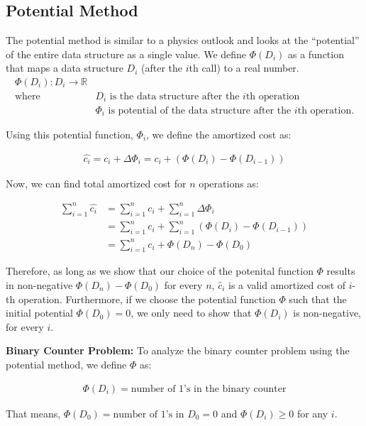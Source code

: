 \documentclass[11pt]{article}
\theoremstyle{definition}
\begin{document}
\subsection{Potential Method}
\label{sub:potential}

The potential method is similar to a physics outlook and looks at the ``potential'' of the entire data structure as a single value.  
We define $\Phi(D_i)$ as a function that maps a data structure $D_i$ (after the $i$th call) to a real number.
\begin{align*}
\Phi(D_i) : D_i \rightarrow \mathbb{R}&\\
\text{where } & \text{$D_i$ is the data structure after the $i$th operation}\\
&\Phi_i \text{ is potential of the data structure after the $i$th operation.}
\end{align*}

Using this potential function, $\Phi_i$, we define the amortized cost as:

\begin{eqnarray*}
\hat{c_i} = c_i + \Delta \Phi_i = c_i + (\Phi(D_i) - \Phi(D_{i-1}))
\end{eqnarray*}

Now, we can find total amortized cost for $n$ operations as:

\begin{align*}
\sum_{i=1}^{n}\hat{c_i} &= \sum_{i=1}^{n}c_i + \sum_{i=1}^{n}\Delta\Phi_i \\
&= \sum_{i=1}^{n}c_i + \sum_{i=1}^{n}(\Phi(D_i) - \Phi(D_{i-1})) \\
&= \sum_{i=1}^{n}c_i + \Phi(D_n) - \Phi(D_0)
\end{align*}

Therefore, as long as we show that our choice of the potenital function $\Phi$ results in non-negative $\Phi(D_n) - \Phi(D_0)$ for every $n$, $\hat{c}_i$ is a valid amortized cost of $i$-th operation. Furthermore, if we choose the potential function $\Phi$ such that the initial potential $\Phi(D_0)=0$, we only need to show that $\Phi(D_i)$ is non-negative, for every $i$.


\textbf{Binary Counter Problem:} To analyze the binary counter problem using the potential method, we define $\Phi$ as:

\begin{eqnarray*}
\Phi(D_i) = \text{number of 1's in the binary counter}
\end{eqnarray*}

That means, $\Phi(D_0) = \text{number of 1's in $D_0$} = 0$ and $\Phi(D_i) \ge 0$ for any $i$. \\
\end{document}
